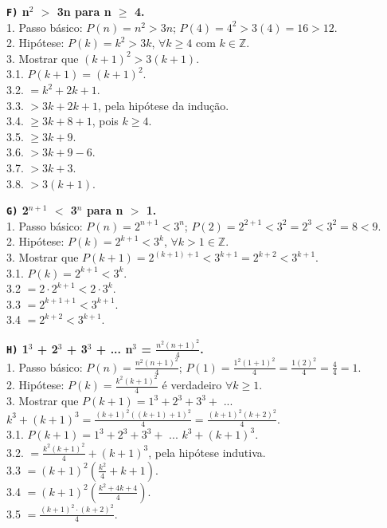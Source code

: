 \documentclass[12pt, a4paper]{article}
\newcommand{\Z}{\mathbb{Z}}
\newcommand\tab[1][1cm]{\hspace*{#1}}
\begin{document}
\begin{flushleft}
\vskip10mm

\textbf{\textbf{\texttt{F)}} n$^{2}$ $>$ 3n para n $\geq$ 4.\\}
\textsf{1. Passo básico: $P(n) = n^2 > 3n$; $P(4) = 4^2 > 3(4) = 16 > 12$.
\\2. Hipótese: $P(k) = k^2 > 3k$, $ \forall k \geq 4 $ com $k \in \Z$.
\\3. Mostrar que $(k+1)^2 > \boxed{3(k+1)}$.
\\3.1. $P(k+1) = (k+1)^2$.
\\3.2.\tab \tab[0.75cm] $=k^2 + 2k + 1 $.
\\3.3.\tab \tab[0.75cm] $> 3k+2k+1 $, pela hipótese da indução.
\\3.4.\tab \tab[0.75cm] $\geq 3k+8+1 $, pois $k \geq 4$.
\\3.5.\tab \tab[0.75cm] $\geq 3k+9 $.
\\3.6.\tab \tab[0.75cm] $> 3k+9-6 $.
\\3.7.\tab \tab[0.75cm] $> 3k+3 $.
\\3.8.\tab \tab[0.75cm] $> \boxed{3(k+1) }$.}

\pagebreak

\textbf{\textbf{\texttt{G)}} 2$^{n+1}$ $<$ 3$^n$ para n $>$ 1.\\}
\textsf{1. Passo básico: $P(n) = 2^{n+1} < 3^n$; $P(2) = 2^{2+1} < 3^2 = 2^3 < 3^2 = 8 < 9$.
\\2. Hipótese: $P(k) = 2^{k+1} < 3^k$, $\forall k > 1 \in \Z$.
\\3. Mostrar que $P(k+1) = 2^{(k+1)+1} < 3^{k+1} = \boxed{2^{k+2} < 3^{k+1}}$.
\\3.1. $P(k) = 2^{k+1} < 3^k$.
\\3.2 \tab[1.05cm] $= 2 \cdot 2^{k+1} < 2 \cdot 3^k $.
\\3.3 \tab[1.05cm] $= 2^{k+1+1} < 3^{k+1} $.
\\3.4 \tab[1.05cm] $= \boxed{2^{k+2} < 3^{k+1}} $.}

\vskip10mm

\textbf{\textbf{\texttt{H)}} 1$^3$ + 2$^3$ + 3$^3$ + ... n$^3$ = $\frac{n^2(n+1)^2}{4}$.\\}
\textsf{1. Passo básico: $P(n) = \frac{n^2(n+1)^2}{4}$; $P(1) = \frac{1^2(1+1)^2}{4} = \frac{1(2)^2}{4} = \frac{4}{4} = 1 $.
\\2. Hipótese: $P(k) = \frac{k^2(k+1)^2}{4}$ é verdadeiro $\forall k \geq 1$.
\\3. Mostrar que $P(k+1) = 1^3 + 2^3 + 3^3 +$ ... $k^3 + (k+1)^3 = \frac{(k+1)^2((k+1)+1)^2}{4} = \frac{(k+1)^2(k+2)^2}{4}$.
\\3.1. $P(k+1) = 1^3 + 2^3 + 3^3 +$ ... $k^3 + (k+1)^3$.
\\3.2.\tab \tab[0.76cm] $=\frac{k^2(k+1)^2}{4}+ (k+1)^3$, pela hipótese indutiva.
\\3.3 \tab \tab[0.76cm] $= (k+1)^2(\frac{k^2}{4} + k + 1)$.
\\3.4 \tab \tab[0.76cm] $= (k+1)^2(\frac{k^2+4k+4}{4})$.
\\3.5 \tab \tab[0.76cm] $= \boxed{\frac{(k+1)^2 \cdot (k+2)^2}{4}}$.}
 
 
\end{flushleft}   
\end{document}

